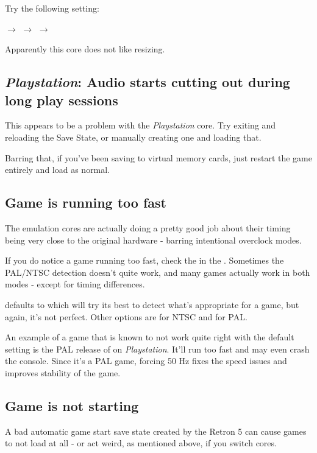 \documentclass[a4paper]{article}
\begin{document}
Try the following setting:

 $\rightarrow$  $\rightarrow$  $\rightarrow$ 

Apparently this core does not like resizing.

\subsection{\emph{Playstation}: Audio starts cutting out during long play sessions}

This appears to be a problem with the \emph{Playstation} core. Try exiting and reloading the Save State, or manually creating one and loading that.

Barring that, if you've been saving to virtual memory cards, just restart the game entirely and load as normal.

\subsection{Game is running too fast}

The emulation cores are actually doing a pretty good job about their timing being very close to the original hardware - barring intentional overclock modes.

If you do notice a game running too fast, check the  in the . Sometimes the PAL/NTSC detection doesn't quite work, and many games actually work in both modes - except for timing differences.

 defaults to  which will try its best to detect what's appropriate for a game, but again, it's not perfect. Other options are  for NTSC and  for PAL.

An example of a game that is known to not work quite right with the default  setting is the PAL release of  on \emph{Playstation}. It'll run too fast and may even crash the console. Since it's a PAL game, forcing 50 Hz fixes the speed issues and improves stability of the game.

\subsection{Game is not starting}

A bad automatic game start save state created by the Retron 5 can cause games to not load at all - or act weird, as mentioned above, if you switch cores.
\end{document}
